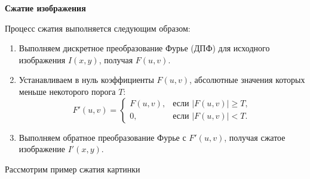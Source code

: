 \textbf{Сжатие изображения}{

Процесс сжатия выполняется следующим образом:
\begin{enumerate}
    \item Выполняем дискретное преобразование Фурье (ДПФ) для исходного изображения $I(x, y)$, получая $F(u, v)$.
    \item Устанавливаем в нуль коэффициенты $F(u, v)$, абсолютные значения которых меньше некоторого порога $T$:
    \[
    F'(u, v) = 
    \begin{cases} 
    F(u, v), & \text{если } |F(u, v)| \geq T, \\
    0, & \text{если } |F(u, v)| < T.
    \end{cases}
    \]
    \newpage
    \item Выполняем обратное преобразование Фурье с $F'(u, v)$, получая сжатое изображение $I'(x, y)$.
\end{enumerate}
  
Рассмотрим пример сжатия картинки 

}
